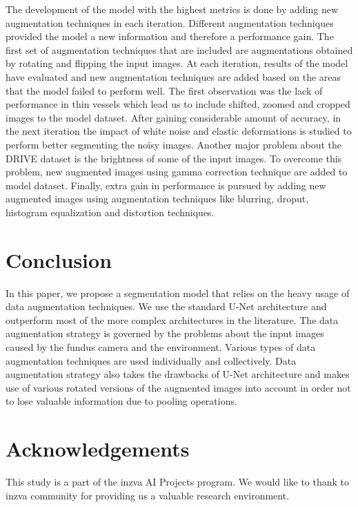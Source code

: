 \documentclass{article}
\begin{document}
The development of the model with the highest metrics is done by adding new augmentation techniques in each iteration. Different augmentation techniques provided the model a new information and therefore a performance gain. The first set of augmentation techniques that are included are augmentations obtained by rotating and flipping the input images. At each iteration, results of the model have evaluated and new augmentation techniques are added based on the areas that the model failed to perform well. The first observation was the lack of performance in thin vessels which lead us to include shifted, zoomed and cropped images to the model dataset. After gaining considerable amount of accuracy, in the next iteration the impact of white noise and elastic deformations is studied to perform better segmenting the noisy images. Another major problem about the DRIVE dataset is the brightness of some of the input images. To overcome this problem, new augmented images using gamma correction technique are added to model dataset. Finally, extra gain in performance is pursued by adding new augmented images using augmentation techniques like blurring, droput, histogram equalization and distortion techniques.

\section{Conclusion}
In this paper, we propose a segmentation model that relies on the heavy usage of data augmentation techniques. We use the standard U-Net architecture and outperform most of the more complex architectures in the literature. The data augmentation strategy is governed by the problems about the input images caused by the fundus camera and the environment. Various types of data augmentation techniques are used individually and collectively. Data augmentation strategy also takes the drawbacks of U-Net architecture and makes use of various rotated versions of the augmented images into account in order not to lose valuable information due to pooling operations. 

\section{Acknowledgements}
This study is a part of the inzva AI Projects program. We would like to thank to inzva community for providing us a valuable research environment.


\printbibliography 
\end{document}
